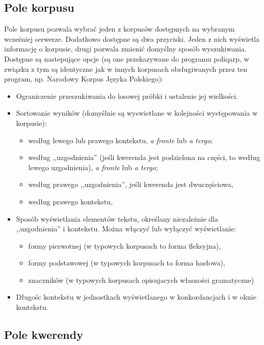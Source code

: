 \documentclass{mwart}
\begin{document}
\subsection{Pole korpusu}
\label{sec:pole-korpusu}

Pole korpusu pozwala wybrać jeden z korpusów dostępnych na wybranym
wcześniej serwerze. Dodatkowo dostępne są dwa przyciski. Jeden z nich
wyświetla informację o korpusie, drugi pozwala zmienić domyślny sposób
wyszukiwania. Dostępne są nastepujące opcje (są one przekazywane do
programu \textsf{poliqarp}, w związku z tym są identyczne jak w innych
korpusach obsługiwanych przez ten program, np. Narodowy Korpus Języka
Polskiego):
\begin{itemize}
\item Ograniczenie przeszukiwania do losowej próbki i ustalenie jej wielkości.
\item Sortowanie wyników (domyślnie są wyswietlane w kolejności
  występowania w korpusie):
  \begin{itemize}
  \item według lewego lub prawego kontekstu, \textit{a fronte} lub
    \textit{a tergo};
  \item według ,,uzgodnienia'' (jeśli kwerenda jest podzielona na
    części, to według lewego uzgodnienia), \textit{a fronte} lub
    \textit{a tergo};
  \item według prawego ,,uzgodnienia'', jeśli kwerenda jest
    dwuczęściowa,
  \item według prawego kontekstu,
  \end{itemize}
\item Sposób wyświetlania elementów tekstu, określany niezależnie dla
  ,,uzgodnienia'' i kontekstu. Można włączyć lub wyłączyć
  wyświetlanie:
  \begin{itemize}
  \item formy pierwotnej (w typowych korpusach to forma fleksyjna),
  \item formy podstawowej (w typowych korpusach to forma hasłowa),
  \item znaczników (w typowych korpusach opisujacych własności gramatyczne)
  \end{itemize}
\item Długośc kontekstu w jednostkach wyświetlanego w konkordancjach i
  w oknie kontekstu.
\end{itemize}

\subsection{Pole kwerendy}
\label{sec:pole-kwerendy}
\end{document}
